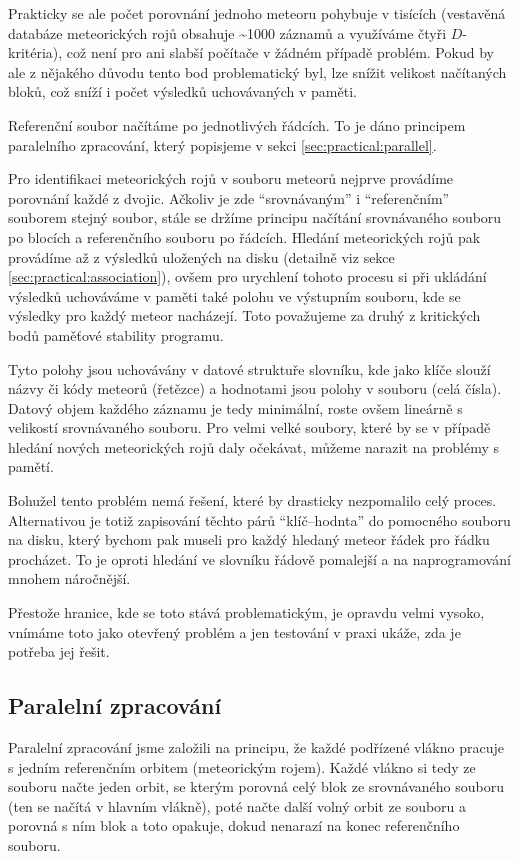 Prakticky se ale počet porovnání jednoho meteoru pohybuje v tisících (vestavěná databáze meteorických rojů obsahuje \textasciitilde1000 záznamů a využíváme čtyři $D$-kritéria), což není pro ani slabší počítače v žádném případě problém. Pokud by ale z nějakého důvodu tento bod problematický byl, lze snížit velikost načítaných bloků, což sníží i počet výsledků uchovávaných v paměti.

\medskip

Referenční soubor načítáme po jednotlivých řádcích. To je dáno principem paralelního zpracování, který popisjeme v sekci \ref{sec:practical:parallel}.

\medskip

Pro identifikaci meteorických rojů v souboru meteorů nejprve provádíme porovnání každé z dvojic. Ačkoliv je zde "`srovnávaným"' i "`referenčním"' souborem stejný soubor, stále se držíme principu načítání srovnávaného souboru po blocích a referenčního souboru po řádcích. Hledání meteorických rojů pak provádíme až z výsledků uložených na disku (detailně viz sekce \ref{sec:practical:association}), ovšem pro urychlení tohoto procesu si při ukládání výsledků uchováváme v paměti také polohu ve výstupním souboru, kde se výsledky pro každý meteor nacházejí. Toto považujeme za druhý z kritických bodů paměťové stability programu.

\smallskip

Tyto polohy jsou uchovávány v datové struktuře slovníku, kde jako klíče slouží názvy či kódy meteorů (řetězce) a hodnotami jsou polohy v souboru (celá čísla). Datový objem každého záznamu je tedy minimální, roste ovšem lineárně s velikostí srovnávaného souboru. Pro velmi velké soubory, které by se v případě hledání nových meteorických rojů daly očekávat, můžeme narazit na problémy s pamětí.

Bohužel tento problém nemá řešení, které by drasticky nezpomalilo celý proces. Alternativou je totiž zapisování těchto párů "`klíč--hodnta"' do pomocného souboru na disku, který bychom pak museli pro každý hledaný meteor řádek pro řádku procházet. To je oproti hledání ve slovníku řádově pomalejší a na naprogramování mnohem náročnější.

Přestože hranice, kde se toto stává problematickým, je opravdu velmi vysoko, vnímáme toto jako otevřený problém a jen testování v praxi ukáže, zda je potřeba jej řešit.

\subsection{Paralelní zpracování\label{sec:practical:parallel}}%
Paralelní zpracování jsme založili na principu, že každé podřízené vlákno pracuje s jedním referenčním orbitem (meteorickým rojem). Každé vlákno si tedy ze souboru načte jeden orbit, se kterým porovná celý blok ze srovnávaného souboru (ten se načítá v hlavním vlákně), poté načte další volný orbit ze souboru a porovná s ním blok a toto opakuje, dokud nenarazí na konec referenčního souboru.

